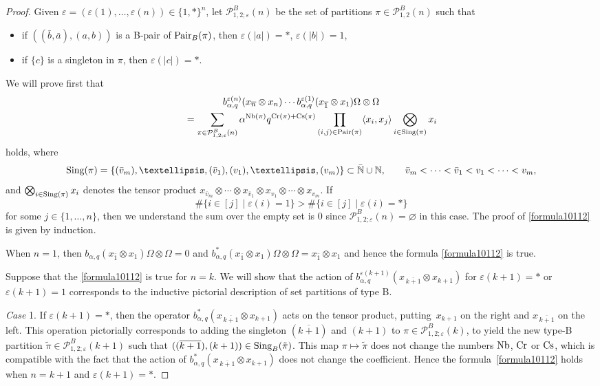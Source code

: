 \documentclass[11pt]{article}
\numberwithin{equation}{section}
\numberwithin{equation}{section}
\def\N{{\mathbb N}}
\def\B{b_{\s,\q}}
\def\P{\mathcal{P}}
\def\PB{\mathcal{P}^{B}}
\def\Cr{\text{\normalfont Cr}}
\def\InS{\text{\normalfont Cs}}
\def\NB{\text{\normalfont Nb}}
\def\Pair{\text{\normalfont Pair}}
\def\Sing{\text{\normalfont Sing}}
\renewcommand{\epsilon}{\varepsilon}
\newcommand{\q}{q}
\newcommand{\s}{\alpha}%
\begin{document}
\begin{proof}
Given
$\epsilon=(\epsilon(1), \dots, \epsilon(n))\in\{1,\ast\}^{n}$, let
$\P_{1,2;\epsilon}^{B}(n)$ be the set of partitions $\pi\in
\P_{1,2}^{B}(n)$ such that
\begin{itemize}\itemsep=0pt
\item if $((\bar b ,\bar a) , (a,b))$ is a B-pair of
$\Pair_B(\pi)$, then $\epsilon(|a|)= \ast$, $\epsilon(|b|)=1$,
\item if $\{c\}$ is a singleton in $\pi$, then $\epsilon( |c|)=\ast$.
\end{itemize}
We will prove first that
\begin{gather}
\B^{\epsilon(n)}(x_{\overline{n}}\otimes x_{n})\cdots \B^{\epsilon(1)}(x_{\overline{1}}\otimes x_1)\Omega \otimes \Omega \nonumber
\\
\qquad{} = \sum_{\pi\in\PB_{1,2;\epsilon}(n)} \s^{\NB(\pi)}q^{\Cr(\pi)+ \InS(\pi)}
\prod_{\substack{(i,j) \in \Pair(\pi)} }\langle x_i, x_j\rangle
\bigotimes_{i\in \Sing(\pi)} x_i\label{formula10112}
\end{gather}
holds, where
\[
\Sing(\pi) = \{(\bar v_m),\dots,(\bar v_1), (v_1),\dots,(v_m)\} \subset\bar{\N} \cup \N, \qquad
\bar v_m<\cdots < \bar v_1< v_1<\cdots < v_m,
\]
and
$\bigotimes_{i\in \Sing(\pi)} x_i$ denotes the tensor product $x_{\bar v_m}\otimes \cdots \otimes x_{\bar v_1} \otimes x_{v_1}\otimes \cdots \otimes x_{v_m}$.
If
\[
\#\{i\in[j] \mid \epsilon(i)=1\}>\#\{i\in[j] \mid \epsilon(i)=\ast\}
\]
for some $j\in\{1,\dots,n\}$, then we understand the sum over the empty set is 0 since $\PB_{1,2;\epsilon}(n)=\varnothing$ in this case.
The proof of \eqref{formula10112} is given by induction.

When $n=1$, then $\B(x_{\bar 1}\otimes x_1)\Omega\otimes \Omega=0$ and $\B^\ast(x_{\bar 1}\otimes x_1)\Omega\otimes \Omega=x_{\bar 1}\otimes x_1$ and hence the formula \eqref{formula10112} is true.

Suppose that the \eqref{formula10112} is true for $n = k$.
We will show that the action of $\B^{\epsilon(k+1)}(x_{\,\overline{k+1}}{}\otimes x_{k+1})$ for $\epsilon(k+1)=\ast$ or $\epsilon(k+1)=1$ corresponds to the inductive pictorial description of set partitions of type B.

\smallskip\noindent
\emph{Case} 1. If $\epsilon(k+1)=\ast$, then the operator $\B^\ast(x_{\,\overline{k+1}}\otimes x_{k+1})$ acts on the tensor product, putting~$x_{k+1}$ on the right and $x_{\,\overline{k+1}}$ on the left. This operation pictorially corresponds to adding the singleton $(\overline{k+1}
)$ and $(k+1)$ to $\pi\in\PB_{1,2;\epsilon}(k)$, to yield the new type-B partition $\tilde{\pi}\in\PB_{1,2;\epsilon}(k+1)$ such that $((\overline{k+1}), (k+1))\in \Sing_B(\tilde{\pi})$. This map $\pi\mapsto \tilde{\pi} $ does not change the numbers $\NB$, $\Cr$ or $\InS$, which is compatible with the fact that the action of $\B^\ast(x_{\,\overline{k+1}}\otimes x_{k+1})$ does not change the coefficient.
Hence the formula~\eqref{formula10112} holds when $n=k+1$ and $\epsilon(k+1)=\ast$.


\end{proof}
\end{document}
